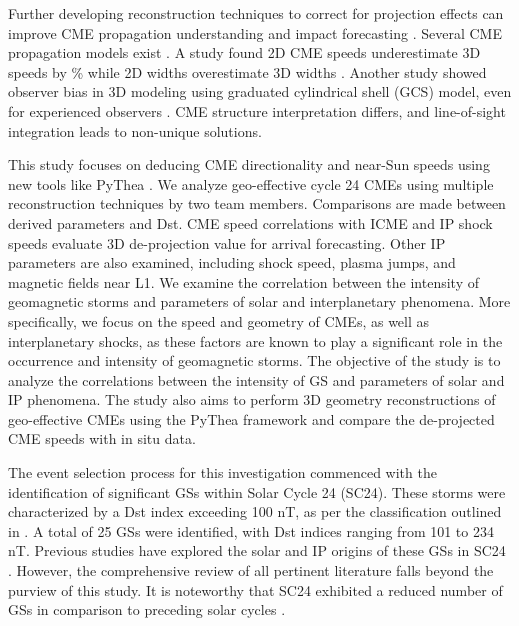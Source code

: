 Further developing reconstruction techniques to correct for projection effects can improve CME propagation understanding and impact forecasting \citep{thernisien_2009, mierla_2010, wood_2010, thernisien_2011}. Several CME propagation models exist \citep{odstrcil_2004, xie_2004, vrvsnak_2013, pomoell_2018}. A study found 2D CME speeds underestimate 3D speeds by \% while 2D widths overestimate 3D widths \citep{jang_2016}. Another study showed observer bias in 3D modeling using graduated cylindrical shell (GCS) model, even for experienced observers \citep{verbeke_2022}. CME structure interpretation differs, and line-of-sight integration leads to non-unique solutions.

This study focuses on deducing CME directionality and near-Sun speeds using new tools like PyThea \citep{kouloumvakos_2022}. We analyze geo-effective cycle 24 CMEs using multiple reconstruction techniques by two team members. Comparisons are made between derived parameters and Dst. CME speed correlations with ICME and IP shock speeds evaluate 3D de-projection value for arrival forecasting. Other IP parameters are also examined, including shock speed, plasma jumps, and magnetic fields near L1. We examine the correlation between the intensity of geomagnetic storms and parameters of solar and interplanetary phenomena. More specifically, we focus on the speed and geometry of CMEs, as well as interplanetary shocks, as these factors are known to play a significant role in the occurrence and intensity of geomagnetic storms. The objective of the study is to analyze the correlations between the intensity of GS and parameters of solar and IP phenomena. The study also aims to perform 3D geometry reconstructions of geo-effective CMEs using the PyThea framework and compare the de-projected CME speeds with in situ data.

The event selection process for this investigation commenced with the identification of significant GSs within Solar Cycle 24 (SC24). These storms were characterized by a Dst index exceeding 100 nT, as per the classification outlined in \citet{gonzalez_1994}. A total of 25 GSs were identified, with Dst indices ranging from 101 to 234 nT. Previous studies have explored the solar and IP origins of these GSs in SC24 \citep{gopalswamy_gs_2022, qiu_2022, besliu_2022, abe_2023}. However, the comprehensive review of all pertinent literature falls beyond the purview of this study. It is noteworthy that SC24 exhibited a reduced number of GSs in comparison to preceding solar cycles \citep{selvakumaran_2016}.


